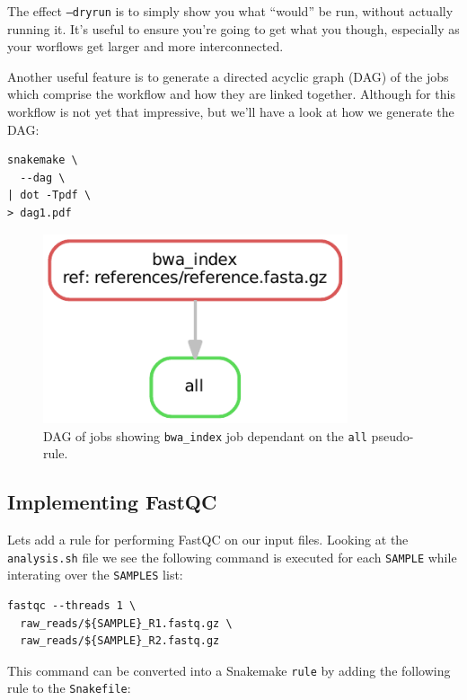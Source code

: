 The effect \texttt{--dryrun} is to simply show you what ``would'' be run, without actually running it. It's useful to ensure you're going to get
what you though, especially as your worflows get larger and more interconnected.

Another useful feature is to generate a directed acyclic graph (DAG) of the jobs which comprise the workflow and how they are linked together. Although
for this workflow is not yet that impressive, but we'll have a look at how we generate the DAG:

\begin{lstlisting}
snakemake \
  --dag \
| dot -Tpdf \
> dag1.pdf
\end{lstlisting}

\begin{figure}[H]
\centering
\includegraphics[width=0.8\textwidth]{handout/dag1.pdf}
\caption{DAG of jobs showing \texttt{bwa\_index} job dependant on the \texttt{all} pseudo-rule.}
\label{fig:dag1}
\end{figure}

\newpage
\subsection{Implementing FastQC}

Lets add a rule for performing FastQC on our input files. Looking at the \texttt{analysis.sh} file we see the following command
is executed for each \texttt{SAMPLE} while interating over the \texttt{SAMPLES} list:

\begin{lstlisting}
fastqc --threads 1 \
  raw_reads/${SAMPLE}_R1.fastq.gz \
  raw_reads/${SAMPLE}_R2.fastq.gz
\end{lstlisting}

This command can be converted into a Snakemake \texttt{rule} by adding the following rule to the \texttt{Snakefile}:

